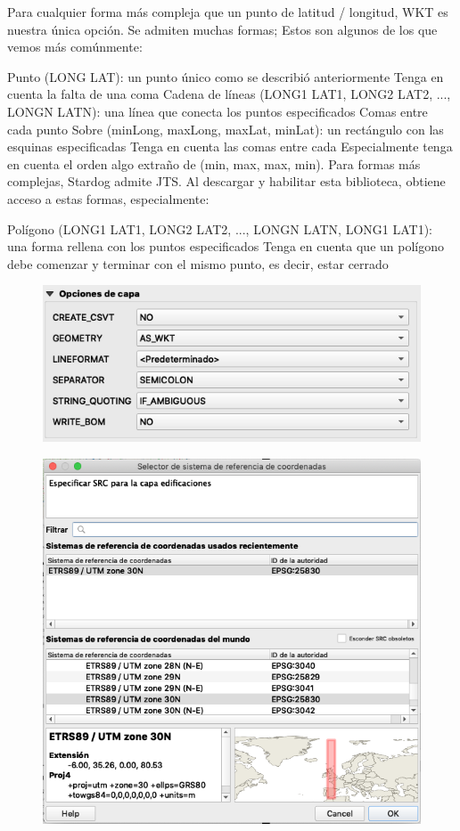 Para cualquier forma más compleja que un punto de latitud / longitud, WKT es nuestra única opción. Se admiten muchas formas; Estos son algunos de los que vemos más comúnmente:

Punto (LONG LAT): un punto único como se describió anteriormente
Tenga en cuenta la falta de una coma
Cadena de líneas (LONG1 LAT1, LONG2 LAT2, ..., LONGN LATN): una línea que conecta los puntos especificados
Comas entre cada punto
Sobre (minLong, maxLong, maxLat, minLat): un rectángulo con las esquinas especificadas
Tenga en cuenta las comas entre cada
Especialmente tenga en cuenta el orden algo extraño de (min, max, max, min).
Para formas más complejas, Stardog admite JTS. Al descargar y habilitar esta biblioteca, obtiene acceso a estas formas, especialmente:

Polígono (LONG1 LAT1, LONG2 LAT2, ..., LONGN LATN, LONG1 LAT1): una forma rellena con los puntos especificados
Tenga en cuenta que un polígono debe comenzar y terminar con el mismo punto, es decir, estar cerrado


\begin{figure}[H]
	\centering
	\includegraphics[width=0.7\linewidth]{imagenes/capitulo4/opciones}
	\caption{}
	\label{fig:opciones}
\end{figure}

\begin{figure}[H]
	\centering
	\includegraphics[width=0.7\linewidth]{imagenes/capitulo4/guardar}
	\caption{}
	\label{fig:guardar}
\end{figure}

